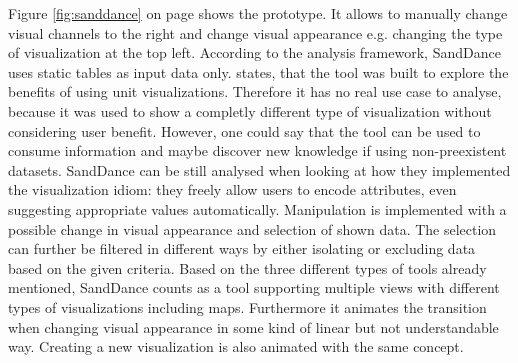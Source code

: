 Figure \ref{fig:sanddance} on page \pageref{fig:sanddance} shows the prototype. It allows to manually change visual channels to the right and change visual appearance e.g. changing the type of visualization at the top left. According to the analysis framework, SandDance uses static tables as input data only. \citeauthor{Drucker2015} states, that the tool was built to explore the benefits of using unit visualizations. Therefore it has no real use case to analyse, because it was used to show a completly different type of visualization without considering user benefit. However, one could say that the tool can be used to consume information and maybe discover new knowledge if using non-preexistent datasets.
SandDance can be still analysed when looking at how they implemented the visualization idiom: they freely allow users to encode attributes, even suggesting appropriate values automatically. Manipulation is implemented with a possible change in visual appearance and selection of shown data. The selection can further be filtered in different ways by either isolating or excluding data based on the given criteria.
Based on the three different types of tools already mentioned, SandDance counts as a tool supporting multiple views with different types of visualizations including maps. Furthermore it animates the transition when changing visual appearance in some kind of linear but not understandable way. Creating a new visualization is also animated with the same concept.
